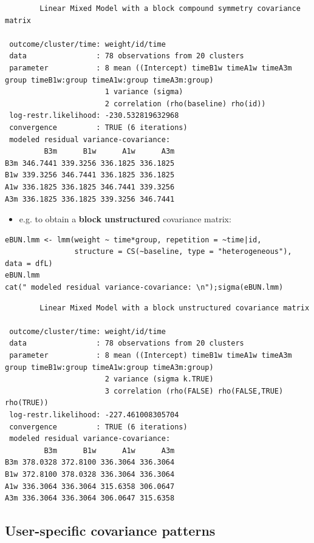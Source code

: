 \documentclass[12pt]{article}
\begin{document}
\begin{verbatim}
		Linear Mixed Model with a block compound symmetry covariance matrix 

 outcome/cluster/time: weight/id/time 
 data                : 78 observations from 20 clusters 
 parameter           : 8 mean ((Intercept) timeB1w timeA1w timeA3m group timeB1w:group timeA1w:group timeA3m:group) 
                       1 variance (sigma) 
                       2 correlation (rho(baseline) rho(id)) 
 log-restr.likelihood: -230.532819632968 
 convergence         : TRUE (6 iterations)
 modeled residual variance-covariance: 
         B3m      B1w      A1w      A3m
B3m 346.7441 339.3256 336.1825 336.1825
B1w 339.3256 346.7441 336.1825 336.1825
A1w 336.1825 336.1825 346.7441 339.3256
A3m 336.1825 336.1825 339.3256 346.7441
\end{verbatim}

\begin{itemize}
\item e.g. to obtain a \textbf{block unstructured} covariance matrix:
\end{itemize}
\lstset{language=r,label= ,caption= ,captionpos=b,numbers=none}
\begin{lstlisting}
eBUN.lmm <- lmm(weight ~ time*group, repetition = ~time|id,
                structure = CS(~baseline, type = "heterogeneous"), data = dfL)
eBUN.lmm
cat(" modeled residual variance-covariance: \n");sigma(eBUN.lmm)
\end{lstlisting}

\begin{verbatim}
		Linear Mixed Model with a block unstructured covariance matrix 

 outcome/cluster/time: weight/id/time 
 data                : 78 observations from 20 clusters 
 parameter           : 8 mean ((Intercept) timeB1w timeA1w timeA3m group timeB1w:group timeA1w:group timeA3m:group) 
                       2 variance (sigma k.TRUE) 
                       3 correlation (rho(FALSE) rho(FALSE,TRUE) rho(TRUE)) 
 log-restr.likelihood: -227.461008305704 
 convergence         : TRUE (6 iterations)
 modeled residual variance-covariance: 
         B3m      B1w      A1w      A3m
B3m 378.0328 372.8100 336.3064 336.3064
B1w 372.8100 378.0328 336.3064 336.3064
A1w 336.3064 336.3064 315.6358 306.0647
A3m 336.3064 336.3064 306.0647 315.6358
\end{verbatim}

\clearpage

\subsection{User-specific covariance patterns}
\label{sec:org7283dac}
\end{document}
